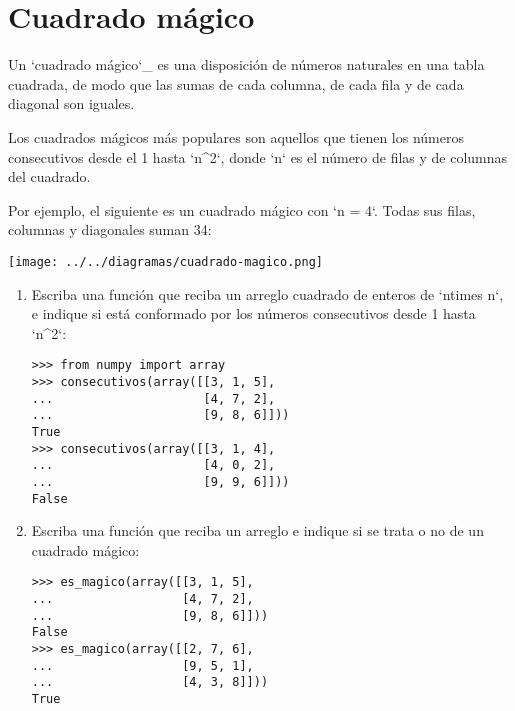 \section{Cuadrado mágico}

Un `cuadrado mágico`\_ es una disposición de números naturales en una
tabla cuadrada, de modo que las sumas de cada columna, de cada fila y de
cada diagonal son iguales.

Los cuadrados mágicos más populares son aquellos que tienen los números
consecutivos desde el 1 hasta `n\^{}2`, donde `n` es el número de filas
y de columnas del cuadrado.

Por ejemplo, el siguiente es un cuadrado mágico con `n = 4`. Todas sus
filas, columnas y diagonales suman 34:

\texttt{[image: ../../diagramas/cuadrado-magico.png]}

\begin{enumerate}
\item
  Escriba una función que reciba un arreglo cuadrado de enteros de
  `ntimes n`, e indique si está conformado por los números consecutivos
  desde 1 hasta `n\^{}2`:

\begin{lstlisting}
>>> from numpy import array
>>> consecutivos(array([[3, 1, 5],
...                     [4, 7, 2],
...                     [9, 8, 6]]))
True
>>> consecutivos(array([[3, 1, 4],
...                     [4, 0, 2],
...                     [9, 9, 6]]))
False
\end{lstlisting}
\item
  Escriba una función que reciba un arreglo e indique si se trata o no
  de un cuadrado mágico:

\begin{lstlisting}
>>> es_magico(array([[3, 1, 5],
...                  [4, 7, 2],
...                  [9, 8, 6]]))
False
>>> es_magico(array([[2, 7, 6],
...                  [9, 5, 1],
...                  [4, 3, 8]]))
True
\end{lstlisting}
\end{enumerate}
